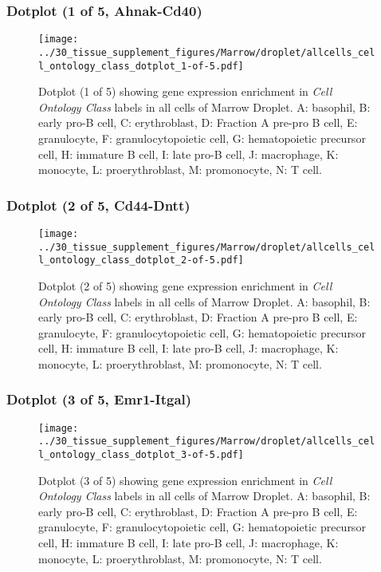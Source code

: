 \clearpage

\subsubsection{Dotplot (1 of 5, Ahnak-Cd40)}
\begin{figure}[h]
\centering
\texttt{[image: ../30\_tissue\_supplement\_figures/Marrow/droplet/allcells\_cell\_ontology\_class\_dotplot\_1-of-5.pdf]}

\caption{ Dotplot (1 of 5)  showing gene expression enrichment in \emph{Cell Ontology Class} labels in all cells of Marrow Droplet. A: basophil, B: early pro-B cell, C: erythroblast, D: Fraction A pre-pro B cell, E: granulocyte, F: granulocytopoietic cell, G: hematopoietic precursor cell, H: immature B cell, I: late pro-B cell, J: macrophage, K: monocyte, L: proerythroblast, M: promonocyte, N: T cell.}
\end{figure}


\clearpage

\subsubsection{Dotplot (2 of 5, Cd44-Dntt)}
\begin{figure}[h]
\centering
\texttt{[image: ../30\_tissue\_supplement\_figures/Marrow/droplet/allcells\_cell\_ontology\_class\_dotplot\_2-of-5.pdf]}

\caption{ Dotplot (2 of 5)  showing gene expression enrichment in \emph{Cell Ontology Class} labels in all cells of Marrow Droplet. A: basophil, B: early pro-B cell, C: erythroblast, D: Fraction A pre-pro B cell, E: granulocyte, F: granulocytopoietic cell, G: hematopoietic precursor cell, H: immature B cell, I: late pro-B cell, J: macrophage, K: monocyte, L: proerythroblast, M: promonocyte, N: T cell.}
\end{figure}


\clearpage

\subsubsection{Dotplot (3 of 5, Emr1-Itgal)}
\begin{figure}[h]
\centering
\texttt{[image: ../30\_tissue\_supplement\_figures/Marrow/droplet/allcells\_cell\_ontology\_class\_dotplot\_3-of-5.pdf]}

\caption{ Dotplot (3 of 5)  showing gene expression enrichment in \emph{Cell Ontology Class} labels in all cells of Marrow Droplet. A: basophil, B: early pro-B cell, C: erythroblast, D: Fraction A pre-pro B cell, E: granulocyte, F: granulocytopoietic cell, G: hematopoietic precursor cell, H: immature B cell, I: late pro-B cell, J: macrophage, K: monocyte, L: proerythroblast, M: promonocyte, N: T cell.}
\end{figure}


